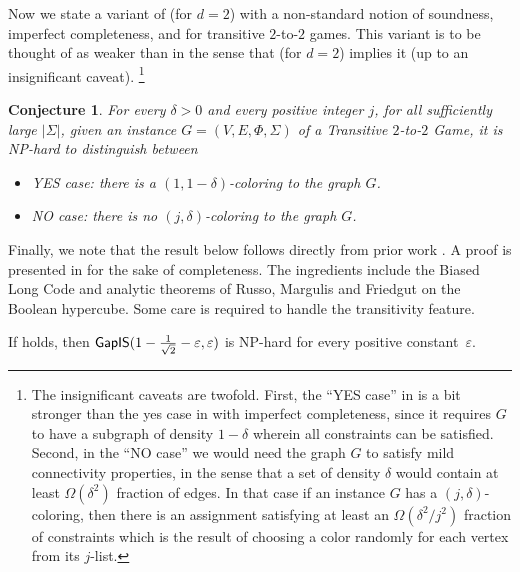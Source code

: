 \documentclass{toc}
\newtheorem{rconj}[theorem]{Conjecture}
\newcommand\eps{\varepsilon}
\begin{document}
Now we state a variant of  (for $d=2$) with a non-standard notion of soundness, imperfect
completeness, and for transitive $2$-to-$2$ games. This variant is to be thought of as weaker than 
in the sense that  (for $d=2$) implies it (up to an insignificant caveat).
\footnote{
The insignificant caveats are twofold. First, the
%
``YES case'' %
in  is a bit stronger
than the yes case in  with imperfect completeness, since it requires $G$ to have a subgraph
of density $1-\delta$ wherein all constraints can be satisfied. Second, in the ``NO case'' we would need the graph $G$
to satisfy mild connectivity properties, in the sense that a set of density $\delta$ would contain at least
$\Omega(\delta^2)$ fraction of edges. In that case if an instance $G$ has a $(j,\delta)$-coloring, then there is an assignment satisfying at least
%
an $\Omega(\delta^2/j^2)$ fraction  %
of constraints which is the result of choosing a color
randomly for each vertex from its $j$-list.}
\begin{rconj}\label{conj:j-delta}
%
%
%
%
%
For every $\delta>0$ and every positive integer $j$,
for all sufficiently large $|\Sigma|$,  %
given an instance $G=(V,E,\Phi,\Sigma)$ of a Transitive $2$-to-$2$ Game,
it is NP-hard to distinguish between
\begin{itemize}
\item YES case: there is a  $(1,1-\delta)$-coloring to the graph $G$.
\item NO case: there is no $(j,\delta)$-coloring to the graph $G$.
\end{itemize}
\end{rconj}

Finally, we note that the result below follows directly from prior
%
work  %
\cite{DS05, Khot02, KR08}.
A proof is presented in  for the sake of completeness.
%
The ingredients include the Biased Long Code
and analytic theorems of Russo, Margulis and Friedgut on the Boolean hypercube.
Some care is required to handle the transitivity feature.

\begin{theorem}\label{thm:j-delta-vc}
If  holds, then
${\sf GapIS}(1-\frac{1}{\sqrt{2}}-\eps, \eps)$ is NP-hard for every positive
constant~$\eps$.  %
%
\end{theorem}
\end{document}
